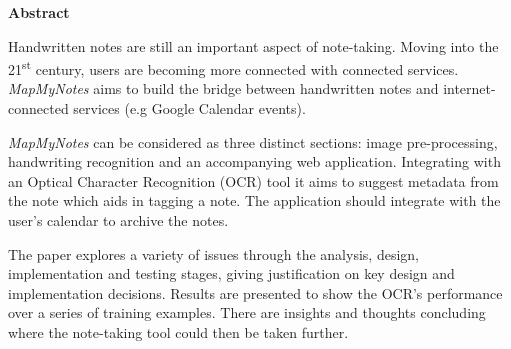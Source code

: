 \thispagestyle{empty}

\begin{center}
    {\LARGE\bf Abstract}
\end{center}


Handwritten notes are still an important aspect of note-taking. Moving into the 21\textsuperscript{st} century, users are becoming more connected with connected services. \textit{MapMyNotes} aims to build the bridge between handwritten notes and internet-connected services (e.g Google Calendar events).

\textit{MapMyNotes} can be considered as three distinct sections: image pre-processing, handwriting recognition and an accompanying web application. Integrating with an Optical Character Recognition (OCR) tool it aims to suggest metadata from the note which aids in tagging a note. The application should integrate with the user's calendar to archive the notes.

The paper explores a variety of issues through the analysis, design, implementation and testing stages, giving justification on key design and implementation decisions. Results are presented to show the OCR's performance over a series of training examples. There are insights and thoughts concluding where the note-taking tool could then be taken further.
